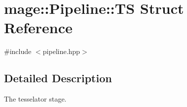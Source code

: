 \hypertarget{structmage_1_1_pipeline_1_1_t_s}{}\section{mage\+:\+:Pipeline\+:\+:TS Struct Reference}
\label{structmage_1_1_pipeline_1_1_t_s}


{\ttfamily \#include $<$pipeline.\+hpp$>$}



\subsection{Detailed Description}
The tesselator stage. 